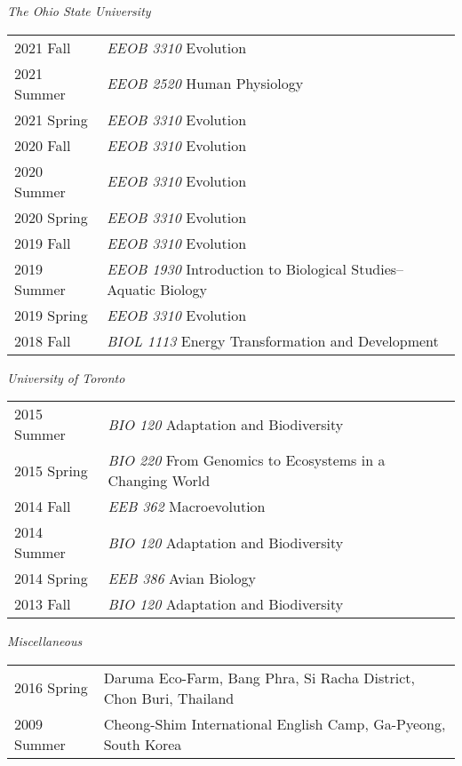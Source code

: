 \documentclass[11pt]{article}
\begin{document}
\textit{The Ohio State University}\\
\begin{longtable}{p{}  p{}}

2021 Fall & \textit{EEOB 3310} Evolution\\
2021 Summer & \textit{EEOB 2520} Human Physiology\\
2021 Spring & \textit{EEOB 3310} Evolution\\
2020 Fall & \textit{EEOB 3310} Evolution\\
2020 Summer & \textit{EEOB 3310} Evolution\\
2020 Spring & \textit{EEOB 3310} Evolution\\
2019 Fall & \textit{EEOB 3310} Evolution\\
2019 Summer & \textit{EEOB 1930} Introduction to Biological Studies--Aquatic Biology\\
2019 Spring & \textit{EEOB 3310} Evolution\\
2018 Fall & \textit{BIOL 1113} Energy Transformation and Development\\
\end{longtable}


\textit{University of Toronto}\\
\begin{longtable}{p{}  p{}}

2015 Summer  & \textit{BIO 120} Adaptation and Biodiversity\\
2015 Spring & \textit{BIO 220} From Genomics to Ecosystems in a Changing World\\
2014 Fall & \textit{EEB 362} Macroevolution\\
2014 Summer & \textit{BIO 120} Adaptation and Biodiversity\\
2014 Spring & \textit{EEB 386} Avian Biology\\
2013 Fall & \textit{BIO 120} Adaptation and Biodiversity\\

\end{longtable}

\textit{Miscellaneous}\\
\begin{longtable}{p{}  p{}}
2016 Spring & Daruma Eco-Farm, Bang Phra, Si Racha District, Chon Buri, Thailand\\
2009 Summer & Cheong-Shim International English Camp, Ga-Pyeong, South Korea\\
\end{longtable}
\hspace{0pt}
\end{document}

